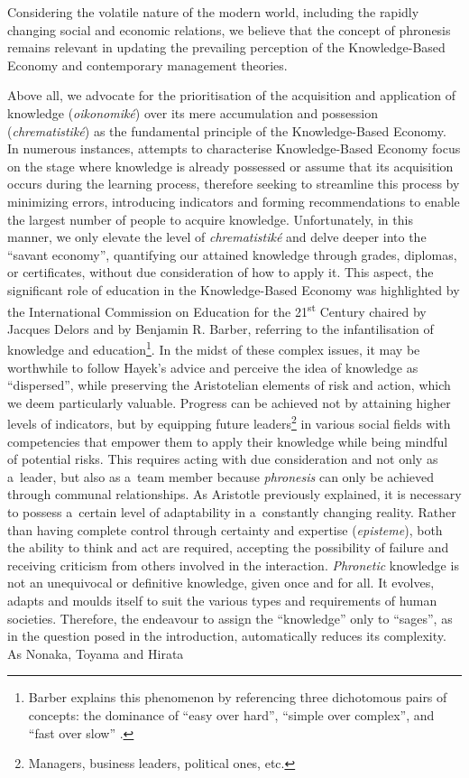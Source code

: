 Considering the volatile nature of the modern world, including the rapidly changing social and economic relations, we believe that the concept of phronesis remains relevant in updating the prevailing perception of the Knowledge-Based Economy and contemporary management theories.



Above all, we advocate for the prioritisation of the acquisition and application of knowledge (\textit{oikonomiké}) over its mere accumulation and possession (\textit{chrematistiké}) as the fundamental principle of the Knowledge-Based Economy. In numerous instances, attempts to characterise Knowledge-Based Economy focus on the stage where knowledge is already possessed or assume that its acquisition occurs during the learning process, therefore seeking to streamline this process by minimizing errors, introducing indicators and forming recommendations to enable the largest number of people to acquire knowledge. Unfortunately, in this manner, we only elevate the level of \textit{chrematistiké} and delve deeper into the ``savant economy'', quantifying our attained knowledge through grades, diplomas, or certificates, without due consideration of how to apply it. This aspect, the significant role of education in the Knowledge-Based Economy was highlighted by the International Commission on Education for the 21\textsuperscript{st} Century chaired by Jacques Delors and by Benjamin R. Barber, referring to the infantilisation of knowledge and education\footnote{Barber explains this phenomenon by referencing three dichotomous pairs of concepts: the dominance of ``easy over hard'', ``simple over complex'', and ``fast over slow'' 
\parencite[][pp.85–107]{barber_consumed_2008}.%
}. In the midst of these complex issues, it may be worthwhile to follow Hayek's advice and perceive the idea of knowledge as ``dispersed'', while preserving the Aristotelian elements of risk and action, which we deem particularly valuable. Progress can be achieved not by attaining higher levels of indicators, but by equipping future leaders\footnote{Managers, business leaders, political ones, etc.} in various social fields with competencies that empower them to apply their knowledge while being mindful of potential risks. This requires acting with due consideration and not only as a~leader, but also as a~team member because \textit{phronesis} can only be achieved through communal relationships. As Aristotle previously explained, it is necessary to possess a~certain level of adaptability in a~constantly changing reality. Rather than having complete control through certainty and expertise (\textit{episteme}), both the ability to think and act are required, accepting the possibility of failure and receiving criticism from others involved in the interaction. \textit{Phronetic} knowledge is not an unequivocal or definitive knowledge, given once and for all. It evolves, adapts and moulds itself to suit the various types and requirements of human societies. Therefore, the endeavour to assign the ``knowledge'' only to ``sages'', as in the question posed in the introduction, automatically reduces its complexity. As Nonaka, Toyama and Hirata 
